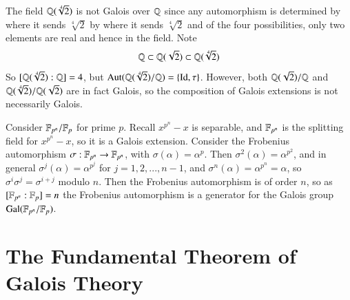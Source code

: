\documentclass[12pt, a4paper, oneside, openright, titlepage]{book}
\begin{document}
\begin{eg}
\begin{center}
    \end{center}
\end{eg}


\begin{eg}
    The field $\mathbb Q(\sqrt[4]{2})$ is not Galois over $\mathbb Q$ since any automorphism is determined by where it sends $\sqrt[4]{2}$ by where it sends $\sqrt[4]{2}$ and of the four possibilities, only two elements are real and hence in the field. Note \begin{equation*}
        \mathbb Q \subset \mathbb Q(\sqrt{2}) \subset \mathbb Q(\sqrt[4]{2})
    \end{equation*}
    So $[\mathbb Q(\sqrt[4]{2}):\mathbb Q] = 4$, but $\operatorname{Aut}(\mathbb Q(\sqrt[4]{2})/\mathbb Q) = \{\operatorname{Id}, \tau\}$. However, both $\mathbb Q(\sqrt{2})/\mathbb Q$ and $\mathbb Q(\sqrt[4]{2})/\mathbb Q(\sqrt{2})$ are in fact Galois, so the composition of Galois extensions is not necessarily Galois.
\end{eg}

\begin{eg}
    Consider $\mathbb F_{p^n}/\mathbb F_p$ for prime $p$. Recall $x^{p^n}-x$ is separable, and $\mathbb F_{p^n}$ is the splitting field for $x^{p^n}-x$, so it is a Galois extension. Consider the Frobenius automorphism $\sigma:\mathbb F_{p^n}\rightarrow \mathbb F_{p^n}$, with $\sigma(\alpha) = \alpha^p$. Then $\sigma^2(\alpha) = \alpha^{p^2}$, and in general $\sigma^j(\alpha) = \alpha^{p^j}$ for $j = 1,2,...,n-1$, and $\sigma^n(\alpha) = \alpha^{p^n} = \alpha$, so $\sigma^i\sigma^j = \sigma^{i+j}$ modulo $n$. Then the Frobenius automorphism is of order $n$, so as $[\mathbb F_{p^n}:\mathbb F_p] = n$ the Frobenius automorphism is a generator for the Galois group $\text{Gal}(\mathbb F_{p^n}/\mathbb F_p)$.
\end{eg}







\section{\textsection The Fundamental Theorem of Galois Theory}
\end{document}
